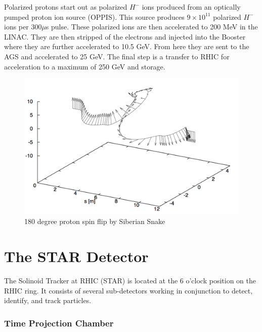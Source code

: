 \documentclass[abstract = on,listof=totoc, bibliography=totoc]{scrreprt}
\begin{document}
Polarized protons start out as polarized $H^-$ ions produced from an optically pumped proton ion source (OPPIS).  This source produces $9\times 10^{11}$ polarized $H^-$ ions per 300$\mu$s pulse. These polarized ions are then accelerated to 200 MeV in the LINAC. They are then stripped of the electrons and injected into the Booster where they are further accelerated to 10.5 GeV. From here they are sent to the AGS and accelerated to 25 GeV. The final step is a transfer to RHIC for acceleration to a maximum of 250 GeV and storage.   \cite{ppCollider}
\begin{figure}
\begin{center}
\includegraphics[width = 1\textwidth]{spinFlipFromPaper}
\caption[Spin flip by Siberian Snake]{180 degree proton spin flip by Siberian Snake}
\label{fig:spinFlip}
\end{center}
\end{figure}



\FloatBarrier

\section{The STAR Detector}
The Solinoid Tracker at RHIC (STAR) is located at the 6 o'clock position on the RHIC ring. It consists of several sub-detectors working in conjunction to detect, identify, and track particles. 

\subsubsection[TPC]{Time Projection Chamber}
\end{document}
